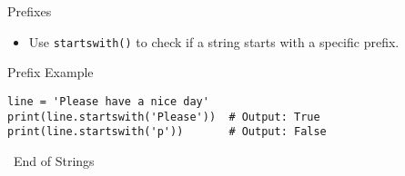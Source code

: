 \documentclass[serif, aspectratio=169]{beamer}
\begin{document}
\begin{frame}{Prefixes}
    \begin{itemize}
        \item Use \texttt{startswith()} to check if a string starts with a specific prefix.
    \end{itemize}
\end{frame}

\begin{frame}[fragile]{Prefix Example}
    \begin{lstlisting}
line = 'Please have a nice day'
print(line.startswith('Please'))  # Output: True
print(line.startswith('p'))       # Output: False
    \end{lstlisting}
\end{frame}

\begin{frame}
    \begin{center}
        {\Huge\ End of Strings}
    \end{center}
\end{frame}
\end{document}
